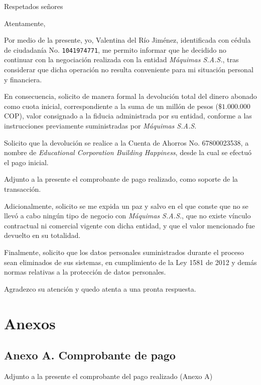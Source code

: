 \documentclass[11pt,a4paper,sans]{moderncv}
\begin{document}
\date{15 de Octubre, 2025}
\opening{Respetados señores}
\closing{Atentamente,}
\makelettertitle{}

Por medio de la presente, yo, Valentina del Río Jiménez, identificada con
cédula de ciudadanía No. \texttt{1041974771}, me permito informar que he
decidido no continuar con la negociación realizada con la entidad
\textit{Máquimas S.A.S.}, tras considerar que dicha operación no resulta
conveniente para mi situación personal y financiera.

En consecuencia, solicito de manera formal la devolución total del dinero
abonado como cuota inicial, correspondiente a la suma de un millón de pesos
($\$1.000.000$ COP), valor consignado a la fiducia administrada por su entidad,
conforme a las instrucciones previamente suministradas por \textit{Máquimas
    S.A.S.}

Solicito que la devolución se realice a la Cuenta de Ahorros No. 67800023538, a
nombre de \textit{Educational Corporation Building Happiness}, desde la cual se efectuó
el pago inicial.

Adjunto a la presente el comprobante de pago realizado, como soporte de la
transacción.

Adicionalmente, solicito se me expida un paz y salvo en el que conste que no se
llevó a cabo ningún tipo de negocio con \textit{Máquimas S.A.S.}, que no existe
vínculo contractual ni comercial vigente con dicha entidad, y que el valor
mencionado fue devuelto en su totalidad.

Finalmente, solicito que los datos personales suministrados durante el proceso
sean eliminados de sus sistemas, en cumplimiento de la Ley 1581 de 2012 y demás
normas relativas a la protección de datos personales.

Agradezco su atención y quedo atenta a una pronta respuesta.

\makeletterclosing{}

\clearpage{}
\section*{Anexos}

\subsection*{Anexo A. Comprobante de pago}
Adjunto a la presente el comprobante del pago realizado (Anexo A)
\end{document}
